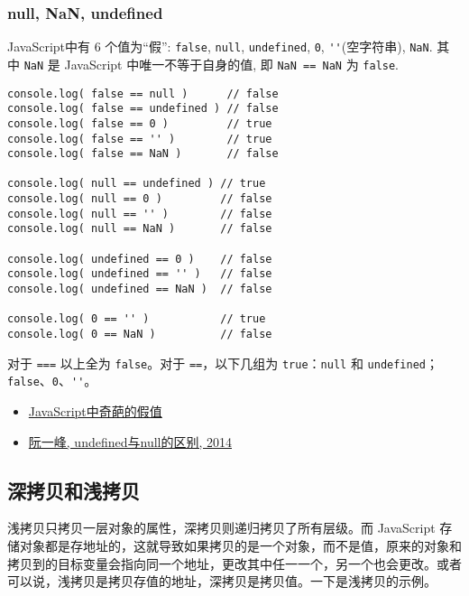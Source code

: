 \subsubsection{null, NaN, undefined}\label{null-nan-undefined}

JavaScript中有 6 个值为``假'': \lstinline!false!, \lstinline!null!,
\lstinline!undefined!, \lstinline!0!, \lstinline!''!(空字符串),
\lstinline!NaN!. 其中 \lstinline!NaN! 是 JavaScript
中唯一不等于自身的值, 即 \lstinline!NaN == NaN! 为 \lstinline!false!.

\begin{lstlisting}
console.log( false == null )      // false
console.log( false == undefined ) // false
console.log( false == 0 )         // true
console.log( false == '' )        // true
console.log( false == NaN )       // false

console.log( null == undefined ) // true
console.log( null == 0 )         // false
console.log( null == '' )        // false
console.log( null == NaN )       // false

console.log( undefined == 0 )    // false
console.log( undefined == '' )   // false
console.log( undefined == NaN )  // false

console.log( 0 == '' )           // true
console.log( 0 == NaN )          // false
\end{lstlisting}

对于 \lstinline!===! 以上全为 \lstinline!false!。对于
\lstinline!==!，以下几组为 \lstinline!true!：\lstinline!null! 和
\lstinline!undefined!；\lstinline!false!、\lstinline!0!、\lstinline!''!。

\begin{itemize}
\tightlist
\item
  \href{http://www.cnblogs.com/snandy/p/3589517.html}{JavaScript中奇葩的假值}
\item
  \href{http://www.ruanyifeng.com/blog/2014/03/undefined-vs-null.html}{阮一峰,
  undefined与null的区别, 2014}
\end{itemize}

\subsection{深拷贝和浅拷贝}\label{ux6df1ux62f7ux8d1dux548cux6d45ux62f7ux8d1d}

浅拷贝只拷贝一层对象的属性，深拷贝则递归拷贝了所有层级。而 JavaScript
存储对象都是存地址的，这就导致如果拷贝的是一个对象，而不是值，原来的对象和拷贝到的目标变量会指向同一个地址，更改其中任一一个，另一个也会更改。或者可以说，浅拷贝是拷贝存值的地址，深拷贝是拷贝值。一下是浅拷贝的示例。

